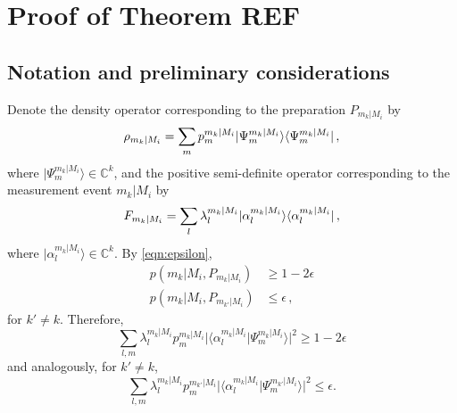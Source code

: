 \chapter{Proof of Theorem REF}
\label{sec:appendix}

\section{Notation and preliminary considerations}
Denote the density operator corresponding to the preparation $P_{m_k\vert M_i}$ by 
\begin{equation}
\label{eqn:densityop}
\rho_{m_k\vert M_i} = \sum_m p_m^{m_k\vert M_i} \vert \Psi_m^{m_k\vert M_i}\rangle\langle \Psi_m^{m_k\vert M_i} \vert\thinspace ,
\end{equation} where $\vert \Psi_m^{m_k\vert M_i} \rangle \in \mathbb{C}^k$, and the positive semi-definite operator corresponding to the measurement event $m_k\vert M_i$ by
\begin{equation}
\label{eqn:mntop}
F_{m_k\vert M_i}=\sum_l \lambda_l^{m_k\vert M_i} \vert \alpha_l^{m_k\vert M_i}\rangle \langle \alpha_l^{m_k\vert M_i} \vert\thinspace ,
\end{equation} where $\vert \alpha_l^{m_k\vert M_i} \rangle \in \mathbb{C}^k$.
By \ref{eqn:epsilon},
\begin{align*}
p(m_k\vert M_i, P_{m_k\vert M_i}) & \geq 1-2\epsilon \\
p(m_k\vert M_i, P_{m_{k'}\vert M_i}) & \leq \epsilon\, ,
\end{align*}
for $k'\neq k$.
Therefore,
\begin{equation}
\label{eqn:cond1}
\sum_{l,m}\lambda_l^{m_k\vert M_i}p_m^{m_k\vert M_i}\vert \langle \alpha_l^{m_k\vert M_i} \vert \Psi_m^{m_k\vert M_i} \rangle \vert^2 \geq 1-2\epsilon
\end{equation}
and analogously, for $k'\neq k$,
\begin{equation}
\label{eqn:cond2}
\sum_{l,m}\lambda_l^{m_k\vert M_i}p_m^{m_{k'}\vert M_i}\vert \langle \alpha_l^{m_k\vert M_i} \vert \Psi_m^{m_{k'}\vert M_i} \rangle \vert^2 \leq \epsilon.
\end{equation}

